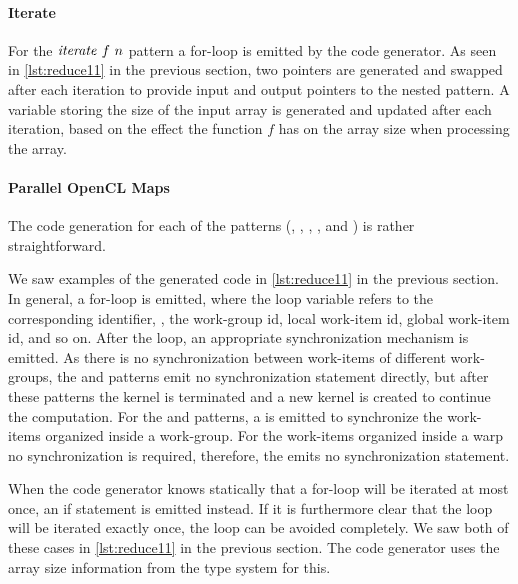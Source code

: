 \paragraph{Iterate}
For the $\text{\textit{iterate}}\ f\ n$ pattern a for-loop is emitted by the code generator.
As seen in \autoref{lst:reduce11} in the previous section, two pointers are generated and swapped after each iteration to provide input and output pointers to the nested pattern.
A variable storing the size of the input array is generated and updated after each iteration, based on the effect the function $f$ has on the array size when processing the array.


\paragraph{Parallel OpenCL Maps}
The \OpenCL code generation for each of the \map patterns (\mapWorkgroup, \mapLocal, \mapGlobal, \mapWarp, and \mapLane) is rather straightforward.

We saw examples of the generated \OpenCL code in \autoref{lst:reduce11} in the previous section.
In general, a for-loop is emitted, where the loop variable refers to the corresponding identifier, \ie, the work-group id, local work-item id, global work-item id, and so on.
After the loop, an appropriate synchronization mechanism is emitted.
As there is no synchronization between work-items of different work-groups, the \mapWorkgroup and \mapGlobal patterns emit no synchronization statement directly, but after these patterns the \OpenCL kernel is terminated and a new \OpenCL kernel is created to continue the computation.
For the \mapLocal and \mapWarp patterns, a  is emitted to synchronize the work-items organized inside a work-group.
For the work-items organized inside a warp no synchronization is required, therefore, the \mapLane emits no synchronization statement.

When the code generator knows statically that a for-loop will be iterated at most once, an if statement is emitted instead.
If it is furthermore clear that the loop will be iterated exactly once, the loop can be avoided completely.
We saw both of these cases in \autoref{lst:reduce11} in the previous section.
The code generator uses the array size information from the type system for this.

